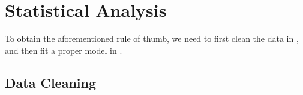 \documentclass[11pt, letterpaper]{article}
\begin{document}
\section{Statistical Analysis}
\label{sec:3}
To obtain the aforementioned rule of thumb, we need to first clean the data in , and then fit a proper model in . 
\subsection{Data Cleaning}
\label{subsec:Cleaning}
\end{document}
